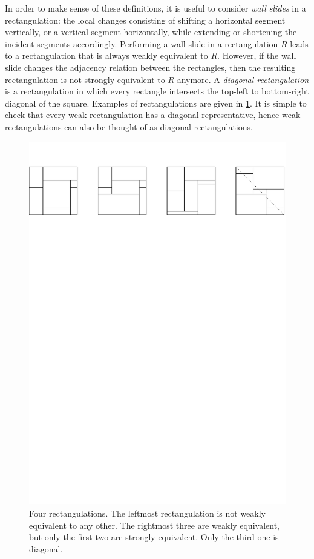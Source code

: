 \documentclass{amsart}
\theoremstyle{definition}
\newcommand{\darkblue}{\color{darkblue}} %
\newcommand{\defn}[1]{\textsl{\darkblue #1}} %
\begin{document}
In order to make sense of these definitions, it is useful to consider \defn{wall slides} in a rectangulation: the local changes consisting of shifting a horizontal segment vertically, or a vertical segment horizontally, while extending or shortening the incident segments accordingly.
Performing a wall slide in a rectangulation $R$ leads to a rectangulation that is always weakly equivalent to $R$.
However, if the wall slide changes the adjacency relation between the rectangles, then the resulting rectangulation is not strongly equivalent to $R$ anymore.
A \defn{diagonal rectangulation} is a rectangulation in which every rectangle intersects the top-left to bottom-right diagonal of the square.
Examples of rectangulations are given in \cref{fig:rectequiv}.
It is simple to check that every weak rectangulation has a diagonal representative, hence weak rectangulations can also be thought of as diagonal rectangulations.

\begin{figure}
  \includegraphics[width=\textwidth]{rectangulations.pdf}
	\caption{Four rectangulations. The leftmost rectangulation is not weakly equivalent to any other. The rightmost three are weakly equivalent, but only the first two are strongly equivalent. Only the third one is diagonal.}
	\label{fig:rectequiv}
\end{figure}
\end{document}
